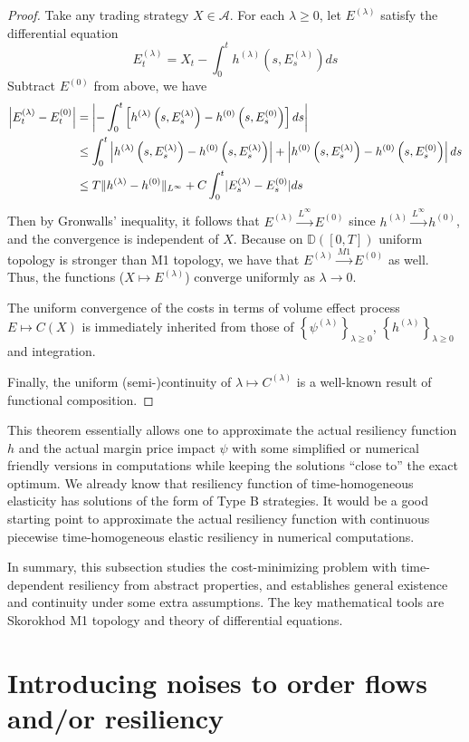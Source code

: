 \documentclass[openany,oneside]{article}
\theoremstyle{definition}
\theoremstyle{remark}
\DeclarePairedDelimiter{\abs}{\lvert}{\rvert} %
\DeclarePairedDelimiter{\norm}{\lVert}{\rVert} %
\begin{document}
\begin{proof}
Take any trading strategy $X\in \mathcal{A}$. For each $\lambda\ge 0$, let $E^{(\lambda)}$ satisfy the differential equation
$$E^{(\lambda)}_t = X_t - \int_0^t h^{(\lambda)}\left(s,E^{(\lambda)}_s\right) ds$$
Subtract $E^{(0)}$ from above, we have
\begin{align*}
\left| E^{(\lambda)}_t - E^{(0)}_t \right| &= \left| -\int_0^t \left[h^{(\lambda)}\left(s,E^{(\lambda)}_s\right) - h^{(0)}\left(s,E^{(0)}_s\right) \right] ds \right| \\
&\le \int_0^t \left|  h^{(\lambda)}\left(s,E^{(\lambda)}_s\right) - h^{(0)}\left(s,E^{(\lambda)}_s\right)\right| + \left| h^{(0)}\left(s,E^{(\lambda)}_s\right) - h^{(0)}\left(s,E^{(0)}_s\right)\right| ds \\
&\le T \norm{h^{(\lambda)}-h^{(0)}}_{L^\infty} + C \int_0^t \abs{E^{(\lambda)}_s-E^{(0)}_s} ds
\end{align*}
Then by Gronwalls' inequality, it follows that $E^{(\lambda)} \xrightarrow{L^\infty} E^{(0)}$ since $h^{(\lambda)} \xrightarrow{L^\infty} h^{(0)}$, and the convergence is independent of $X$. Because on $\mathbb{D}([0,T])$ uniform topology is stronger than M1 topology, we have that $E^{(\lambda)} \xrightarrow{M1} E^{(0)}$ as well. Thus, the functions ($X\mapsto E^{(\lambda)}$) converge uniformly as $\lambda \to 0$.

The uniform convergence of the costs in terms of volume effect process $E\mapsto C(X)$ is immediately inherited from those of $\left\{\psi^{(\lambda)}\right\}_{\lambda\ge 0}$, $\left\{h^{(\lambda)}\right\}_{\lambda\ge 0}$ and integration.

Finally, the uniform (semi-)continuity of $\lambda \mapsto C^{(\lambda)}$ is a well-known result of functional composition.
\end{proof}

This theorem essentially allows one to approximate the actual resiliency function $h$ and the actual margin price impact $\psi$ with some simplified or numerical friendly versions in computations while keeping the solutions ``close to'' the exact optimum. We already know that resiliency function of time-homogeneous elasticity has solutions of the form of Type B strategies. It would be a good starting point to approximate the actual resiliency function with continuous piecewise time-homogeneous elastic resiliency in numerical computations. 

In summary, this subsection studies the cost-minimizing problem with time-dependent resiliency from abstract properties, and establishes general existence and continuity under some extra assumptions. The key mathematical tools are Skorokhod M1 topology and theory of differential equations.


\section{Introducing noises to order flows and/or resiliency}




{}

\end{document}
